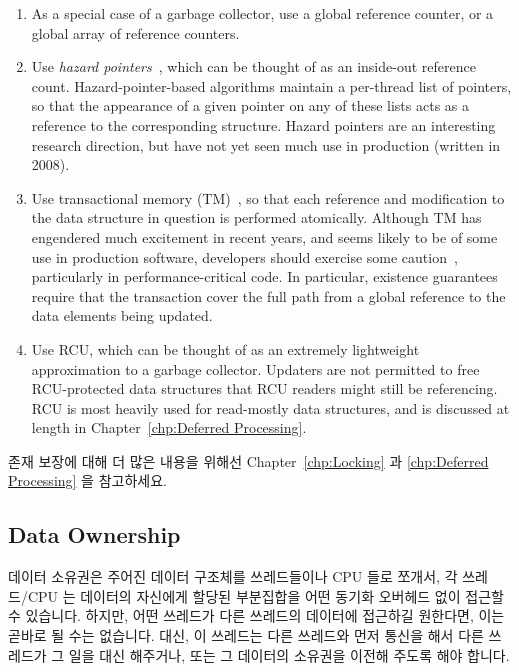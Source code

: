 {\begin{enumerate}
	\item	As a special case of a garbage collector, use a global
		reference counter, or a global array of reference counters.
	\item	Use \emph{hazard pointers}~\cite{MagedMichael04a}, which
		can be thought of as an inside-out reference count.
		Hazard-pointer-based algorithms maintain a per-thread list of
		pointers, so that the appearance of a given pointer on
		any of these lists acts as a reference to the corresponding
		structure.
		Hazard pointers are an interesting research direction, but
		have not yet seen much use in production (written in 2008).
	\item	Use transactional memory
		(TM)~\cite{Herlihy93a,DBLomet1977SIGSOFT,Shavit95},
		so that each reference and
		modification to the data structure in question is
		performed atomically.
		Although TM has engendered much excitement in recent years,
		and seems likely to be of some use in production software,
		developers should exercise some
		caution~\cite{Blundell2005DebunkTM,Blundell2006TMdeadlock,McKenney2007PLOSTM},
		particularly in performance-critical code.
		In particular, existence guarantees require that the
		transaction cover the full path from a global reference
		to the data elements being updated.
	\item	Use RCU, which can be thought of as an extremely lightweight
		approximation to a garbage collector.
		Updaters are not permitted to free RCU-protected
		data structures that RCU readers might still be referencing.
		RCU is most heavily used for read-mostly data structures,
		and is discussed at length in
		Chapter~\ref{chp:Deferred Processing}.
	\fi
	\end{enumerate}

	존재 보장에 대해 더 많은 내용을 위해선 Chapter~\ref{chp:Locking} 과
	\ref{chp:Deferred Processing} 을 참고하세요.

} \QuickQuizEnd

\subsection{Data Ownership}
\label{sec:SMPdesign:Data Ownership}

데이터 소유권은 주어진 데이터 구조체를 쓰레드들이나 CPU 들로 쪼개서, 각
쓰레드/CPU 는 데이터의 자신에게 할당된 부분집합을 어떤 동기화 오버헤드 없이
접근할 수 있습니다.
하지만, 어떤 쓰레드가 다른 쓰레드의 데이터에 접근하길 원한다면, 이는 곧바로 될
수는 없습니다.
대신, 이 쓰레드는 다른 쓰레드와 먼저 통신을 해서 다른 쓰레드가 그 일을 대신
해주거나, 또는 그 데이터의 소유권을 이전해 주도록 해야 합니다.

